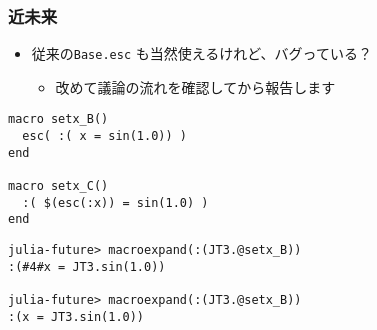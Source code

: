 \begin{frame}[containsverbatim]
\frametitle{近未来}
\begin{itemize}
  \item 従来の\verb|Base.esc| も当然使えるけれど、バグっている？
    \begin{itemize}
      \item 改めて議論の流れを確認してから報告します
    \end{itemize}
\end{itemize}
\begin{lstlisting}
macro setx_B()
  esc( :( x = sin(1.0)) )
end

macro setx_C()
  :( $(esc(:x)) = sin(1.0) )
end
\end{lstlisting}
\begin{lstlisting}
julia-future> macroexpand(:(JT3.@setx_B))
:(#4#x = JT3.sin(1.0))

julia-future> macroexpand(:(JT3.@setx_B))
:(x = JT3.sin(1.0))
\end{lstlisting}
\end{frame}

